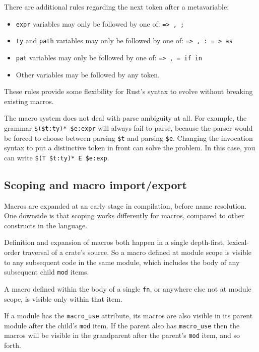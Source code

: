 \documentclass[a4paper,]{book}
\providecommand{\tightlist}{%
  \setlength{\itemsep}{0pt}\setlength{\parskip}{0pt}}
\begin{document}
There are additional rules regarding the next token after a
metavariable:

\begin{itemize}
\tightlist
\item
  \texttt{expr} variables may only be followed by one of:
  \texttt{=\textgreater{}\ ,\ ;}
\item
  \texttt{ty} and \texttt{path} variables may only be followed by one
  of: \texttt{=\textgreater{}\ ,\ :\ =\ \textgreater{}\ as}
\item
  \texttt{pat} variables may only be followed by one of:
  \texttt{=\textgreater{}\ ,\ =\ if\ in}
\item
  Other variables may be followed by any token.
\end{itemize}

These rules provide some flexibility for Rust's syntax to evolve without
breaking existing macros.

The macro system does not deal with parse ambiguity at all. For example,
the grammar \texttt{\$(\$t:ty)*\ \$e:expr} will always fail to parse,
because the parser would be forced to choose between parsing
\texttt{\$t} and parsing \texttt{\$e}. Changing the invocation syntax to
put a distinctive token in front can solve the problem. In this case,
you can write \texttt{\$(T\ \$t:ty)*\ E\ \$e:exp}.

\subsection{Scoping and macro
import/export}\label{scoping-and-macro-importexport}

Macros are expanded at an early stage in compilation, before name
resolution. One downside is that scoping works differently for macros,
compared to other constructs in the language.

Definition and expansion of macros both happen in a single depth-first,
lexical-order traversal of a crate's source. So a macro defined at
module scope is visible to any subsequent code in the same module, which
includes the body of any subsequent child \texttt{mod} items.

A macro defined within the body of a single \texttt{fn}, or anywhere
else not at module scope, is visible only within that item.

If a module has the \texttt{macro\_use} attribute, its macros are also
visible in its parent module after the child's \texttt{mod} item. If the
parent also has \texttt{macro\_use} then the macros will be visible in
the grandparent after the parent's \texttt{mod} item, and so forth.
\end{document}

